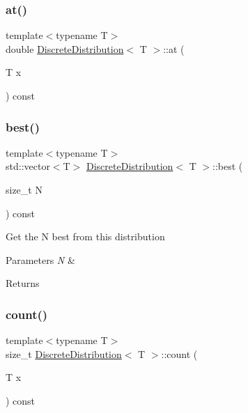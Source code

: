 \subsubsection{\texorpdfstring{at()}{at()}}
{\footnotesize\ttfamily template$<$typename T$>$ \\
double \hyperlink{class_discrete_distribution}{Discrete\+Distribution}$<$ T $>$\+::at (\begin{DoxyParamCaption}\item[{T}]{x }\end{DoxyParamCaption}) const\hspace{0.3cm}{\ttfamily [inline]}}

\mbox{\label{class_discrete_distribution_adee72a8e4c93aa03d841c0c73d6b5498}} 
\subsubsection{\texorpdfstring{best()}{best()}}
{\footnotesize\ttfamily template$<$typename T$>$ \\
std\+::vector$<$T$>$ \hyperlink{class_discrete_distribution}{Discrete\+Distribution}$<$ T $>$\+::best (\begin{DoxyParamCaption}\item[{size\+\_\+t}]{N }\end{DoxyParamCaption}) const\hspace{0.3cm}{\ttfamily [inline]}}

Get the N best from this distribution 
\begin{DoxyParams}{Parameters}
{\em N} & \\
\hline
\end{DoxyParams}
\begin{DoxyReturn}{Returns}

\end{DoxyReturn}
\mbox{\label{class_discrete_distribution_afd3fd83dc776f5616e826de18093328b}} 
\subsubsection{\texorpdfstring{count()}{count()}}
{\footnotesize\ttfamily template$<$typename T$>$ \\
size\+\_\+t \hyperlink{class_discrete_distribution}{Discrete\+Distribution}$<$ T $>$\+::count (\begin{DoxyParamCaption}\item[{T}]{x }\end{DoxyParamCaption}) const\hspace{0.3cm}{\ttfamily [inline]}}

